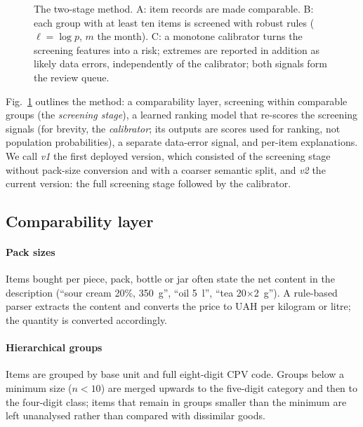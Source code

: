 \documentclass[conference]{IEEEtran}
\begin{document}
\begin{figure}[t]
{}
\caption{The two-stage method. A: item records are made comparable. B: each group with at least ten items
is screened with robust rules ($\ell=\log p$, $m$ the month). C: a monotone calibrator turns the screening
features into a risk; extremes are reported in addition as likely data errors, independently of the
calibrator; both signals form the review queue.}
\label{fig:pipeline}
\end{figure}

Fig.~\ref{fig:pipeline} outlines the method: a comparability layer, screening within comparable groups
(the \emph{screening stage}), a learned ranking model that re-scores the screening signals (for brevity, the
\emph{calibrator}; its outputs are scores used for ranking, not population probabilities), a separate
data-error signal, and per-item explanations. We call \emph{v1} the first deployed version, which consisted
of the screening stage without pack-size conversion and with a coarser semantic split, and \emph{v2} the
current version: the full screening stage followed by the calibrator.

\subsection{Comparability layer}

\paragraph{Pack sizes} Items bought per piece, pack, bottle or jar often state the net content in the
description (``sour cream 20\%, 350~g'', ``oil 5~l'', ``tea 20$\times$2~g''). A rule-based parser extracts the
content and converts the price to UAH per kilogram or litre; the quantity is converted accordingly.

\paragraph{Hierarchical groups} Items are grouped by base unit and full eight-digit CPV code. Groups below
a minimum size ($n<10$) are merged upwards to the five-digit category and then to the four-digit class;
items that remain in groups smaller than the minimum are left unanalysed rather than compared with
dissimilar goods.
\end{document}
